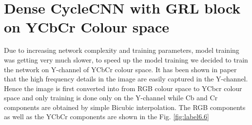 \section{Dense CycleCNN with GRL block on YCbCr Colour space}
Due to increasing network complexity and training parameters, model training was getting very much slower, to speed up the model training we decided to train the network on Y-channel of YCbCr colour space. It has been shown in paper that the high frequency details in the image are easily captured in the Y-channel. Hence the image is first converted into from RGB colour space to YCbcr colour space and only training is done only on the Y-channel while Cb and Cr components are obtained by simple Bicubic interpolation.
\newline
The RGB components as well as the YCbCr components are shown in the Fig. \ref{fig:label6.6}
